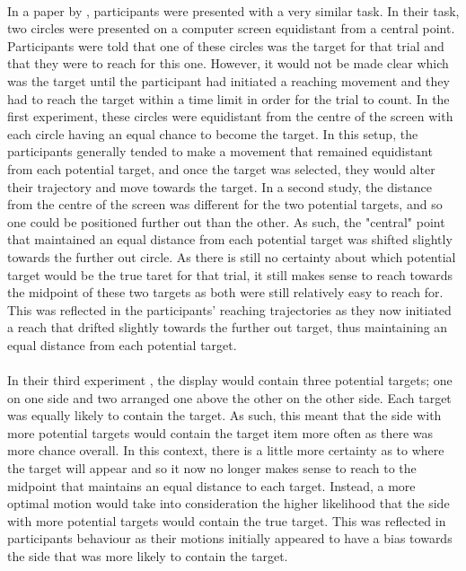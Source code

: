 \documentclass[12pt]{article}
\begin{document}
\paragraph{} In a paper by \cite{CHAPMAN2010168}, participants were presented with a very similar task. In their task, two circles were presented on a computer screen equidistant from a central point. Participants were told that one of these circles was the target for that trial and that they were to reach for this one. However, it would not be made clear which was the target until the participant had initiated a reaching movement and they had to reach the target within a time limit in order for the trial to count. In the first experiment, these circles were equidistant from the centre of the screen with each circle having an equal chance to become the target. In this setup, the participants generally tended to make a movement that remained equidistant from each potential target, and once the target was selected, they would alter their trajectory and move towards the target. In a second study, the distance from the centre of the screen was different for the two potential targets, and so one could be positioned further out than the other. As such, the "central" point that maintained an equal distance from each potential target was shifted slightly towards the further out circle. As there is still no certainty about which potential target would be the true taret for that trial, it still makes sense to reach towards the midpoint of these two targets as both were still relatively easy to reach for. This was reflected in the participants' reaching trajectories as they now initiated a reach that drifted slightly towards the further out target, thus maintaining an equal distance from each potential target. 

\paragraph{} In their third experiment \citep{CHAPMAN2010168}, the display would contain three potential targets; one on one side and two arranged one above the other on the other side. Each target was equally likely to contain the target. As such, this meant that the side with more potential targets would contain the target item more often as there was more chance overall. In this context, there is a little more certainty as to where the target will appear and so it now no longer makes sense to reach to the midpoint that maintains an equal distance to each target. Instead, a more optimal motion would take into consideration the higher likelihood that the side with more potential targets would contain the true target. This was reflected in participants behaviour as their motions initially appeared to have a bias towards the side that was more likely to contain the target. 
\end{document}
